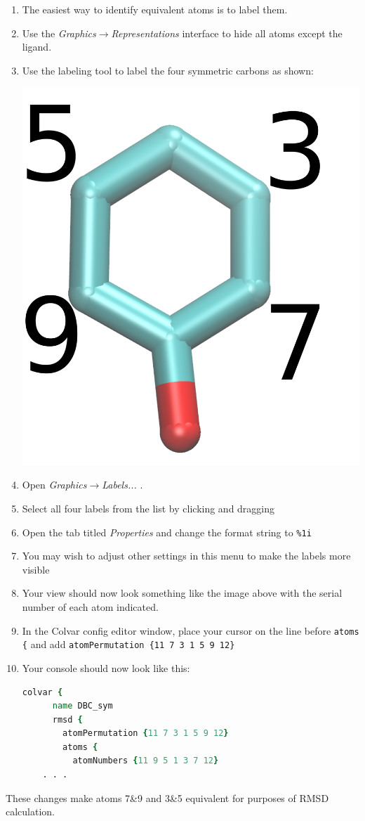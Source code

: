 \documentclass[9pt,tutorial]{Styling/livecoms}
\newcommand{\menu}[1]{
  \textit{#1}
}
\newcommand{\textInput}[1]{
  \texttt{#1}
}
\begin{document}
\begin{enumerate}
     \item The easiest way to identify equivalent atoms is to label them.
     \item Use the \menu{Graphics$\rightarrow$Representations} interface to hide all atoms except the ligand.
     \item Use the labeling tool to label the four symmetric carbons as shown:
     \begin{center}
        \includegraphics[width=0.2\linewidth]{example_symmetry_labels.png}
     \end{center}
     \item Open \menu{Graphics$\rightarrow$Labels...}.
     \item Select all four labels from the list by clicking and dragging
     \item Open the tab titled \menu{Properties} and change the format string to \textInput{\%1i}
     \item You may wish to adjust other settings in this menu to make the labels more visible
     \item Your view should now look something like the image above with the serial number of each atom indicated.
     \item In the Colvar config editor window, place your cursor on the line before \textInput{atoms \{} and add \textInput{atomPermutation \{11 7 3 1 5 9 12\}}
     \item Your console should now look like this:
    \begin{lstlisting}[language=tcl]
    colvar {
      name DBC_sym
      rmsd {
        atomPermutation {11 7 3 1 5 9 12}
        atoms {
          atomNumbers {11 9 5 1 3 7 12}
    . . .
    \end{lstlisting}
\end{enumerate}

These changes make atoms 7\&9 and 3\&5 equivalent for purposes of RMSD calculation.
\end{document}
